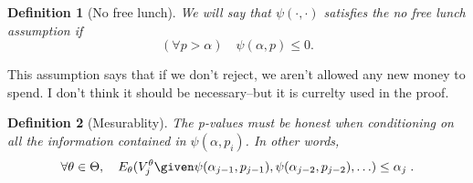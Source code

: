 \documentclass[12pt]{article}
\newtheorem{definition}{Definition}
\begin{document}
\begin{definition}[No free lunch] 
We will say that $\psi(\cdot,\cdot)$ satisfies the {\em no free lunch}
assumption if
\begin{equation}
\label{eq:no:free:lunch}
(\forall p > \alpha) \quad \psi(\alpha,p) \le 0.
\end{equation}
\end{definition}
This assumption says that if we don't reject, we aren't allowed any
new money to spend.  I don't think it should be necessary--but it is
currelty used in the proof.

\begin{definition}[Mesurablity] The p-values must be honest when
conditioning on all the information contained in $\psi(\alpha,p_i)$.
In other words,
\begin{displaymath}
  \forall \theta \in \Theta, \quad
  E_\theta(V^\theta_j \given
\psi(\alpha_{j-1},p_{j-1}),\psi(\alpha_{j-2},p_{j-2}) , \ldots)
  \le \alpha_j   \;.
\end{displaymath}
\end{definition}
\end{document}
